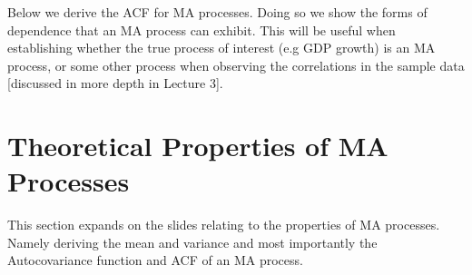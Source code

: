 \documentclass[openany]{tufte-book} %
\begin{document}
 Below we derive the ACF for MA processes. Doing so we show the forms of dependence that an MA process can exhibit. This will be useful when establishing whether the true process of interest (e.g GDP growth) is an MA process, or some other process when observing the correlations in the sample data [discussed in more depth in Lecture 3].











\section{Theoretical Properties of MA Processes}
This section expands on the slides relating to the properties of MA processes. Namely deriving the mean and variance and most importantly the Autocovariance function and ACF of an MA process.
\end{document}
